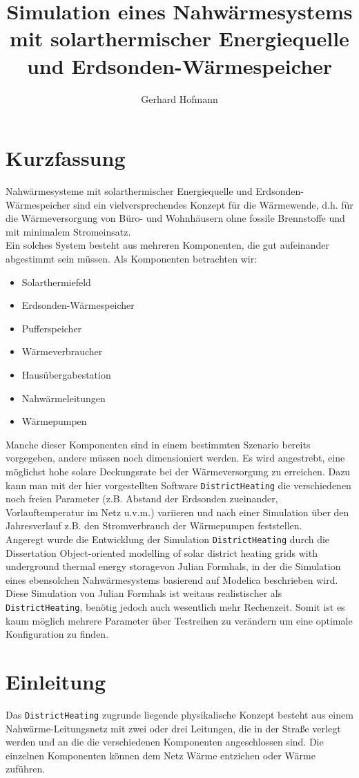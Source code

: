 \documentclass[12pt,a4paper]{article}
\author{Gerhard Hofmann}
\title{Simulation eines Nahwärmesystems mit solarthermischer Energiequelle und Erdsonden-Wärmespeicher}
\begin{document}
\maketitle
\tableofcontents
\section{Kurzfassung}
Nahwärmesysteme mit solarthermischer Energiequelle und Erdsonden-Wärmespeicher sind ein vielversprechendes Konzept für die Wärmewende, d.h. für die Wärmeversorgung von Büro- und Wohnhäusern ohne fossile Brennstoffe und mit minimalem Stromeinsatz.\\
Ein solches System besteht aus mehreren Komponenten, die gut aufeinander abgestimmt sein müssen. Als Komponenten betrachten wir:\begin{itemize}
\item Solarthermiefeld
\item Erdsonden-Wärmespeicher
\item Pufferspeicher
\item Wärmeverbraucher
\item Hausübergabestation
\item Nahwärmeleitungen
\item Wärmepumpen
\end{itemize}
Manche dieser Komponenten sind in einem bestimmten Szenario bereits vorgegeben, andere müssen noch dimensioniert werden. 
Es wird angestrebt, eine möglichst hohe solare Deckungsrate bei der Wärmeversorgung zu erreichen. Dazu kann man mit der hier vorgestellten Software \texttt{DistrictHeating} die verschiedenen noch freien Parameter (z.B. Abstand der Erdsonden zueinander, Vorlauftemperatur im Netz u.v.m.) variieren und nach einer Simulation über den Jahresverlauf z.B. den Stromverbrauch der Wärmepumpen feststellen.\\
Angeregt wurde die Entwicklung der Simulation \texttt{DistrictHeating} durch die Dissertation \glqq Object-oriented modelling of solar district heating grids with underground thermal energy storage\grqq von Julian Formhals, in der die Simulation eines ebensolchen Nahwärmesystems basierend auf  Modelica beschrieben wird. Diese Simulation von Julian Formhals ist weitaus realistischer als \texttt{DistrictHeating}, benötig jedoch auch wesentlich mehr Rechenzeit. Somit ist es kaum möglich mehrere Parameter über Testreihen zu verändern um eine optimale Konfiguration zu finden.
\section{Einleitung}
Das \texttt{DistrictHeating} zugrunde liegende physikalische Konzept besteht aus einem Nahwärme-Leitungsnetz mit zwei oder drei Leitungen, die in der Straße verlegt werden und an die die verschiedenen Komponenten angeschlossen sind. Die einzelnen Komponenten können dem Netz Wärme entziehen oder Wärme zuführen.
\end{document}
